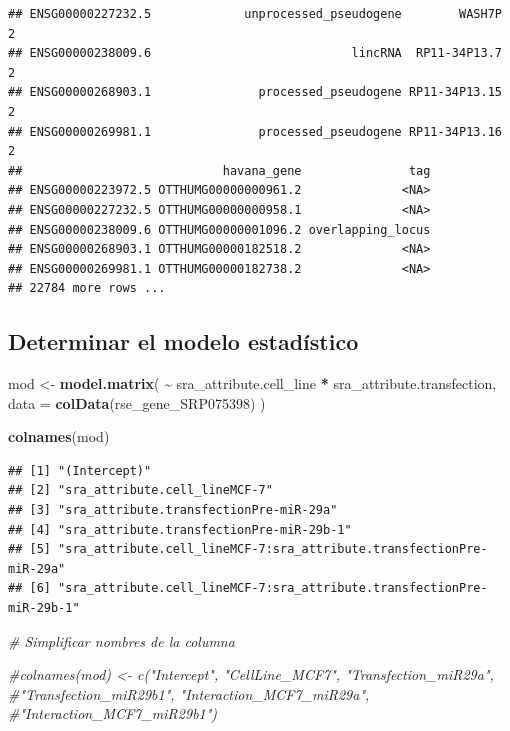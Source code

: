 \documentclass[
]{article}
\newenvironment{Shaded}{\begin{snugshade}}{\end{snugshade}}
\newcommand{\AttributeTok}[1]{\textcolor[rgb]{0.13,0.29,0.53}{#1}}
\newcommand{\CommentTok}[1]{\textcolor[rgb]{0.56,0.35,0.01}{\textit{#1}}}
\newcommand{\FunctionTok}[1]{\textcolor[rgb]{0.13,0.29,0.53}{\textbf{#1}}}
\newcommand{\NormalTok}[1]{#1}
\newcommand{\OtherTok}[1]{\textcolor[rgb]{0.56,0.35,0.01}{#1}}
\newcommand{\SpecialCharTok}[1]{\textcolor[rgb]{0.81,0.36,0.00}{\textbf{#1}}}
\begin{document}
\begin{verbatim}
## ENSG00000227232.5             unprocessed_pseudogene        WASH7P     2
## ENSG00000238009.6                            lincRNA  RP11-34P13.7     2
## ENSG00000268903.1               processed_pseudogene RP11-34P13.15     2
## ENSG00000269981.1               processed_pseudogene RP11-34P13.16     2
##                            havana_gene               tag
## ENSG00000223972.5 OTTHUMG00000000961.2              <NA>
## ENSG00000227232.5 OTTHUMG00000000958.1              <NA>
## ENSG00000238009.6 OTTHUMG00000001096.2 overlapping_locus
## ENSG00000268903.1 OTTHUMG00000182518.2              <NA>
## ENSG00000269981.1 OTTHUMG00000182738.2              <NA>
## 22784 more rows ...
\end{verbatim}

\subsection{Determinar el modelo
estadístico}\label{determinar-el-modelo-estaduxedstico}

\begin{Shaded}
\begin{Highlighting}[]
\NormalTok{mod }\OtherTok{\textless{}{-}} \FunctionTok{model.matrix}\NormalTok{(}
  \SpecialCharTok{\textasciitilde{}}\NormalTok{ sra\_attribute.cell\_line }\SpecialCharTok{*}\NormalTok{ sra\_attribute.transfection,}
  \AttributeTok{data =} \FunctionTok{colData}\NormalTok{(rse\_gene\_SRP075398)}
\NormalTok{)}

\FunctionTok{colnames}\NormalTok{(mod)}
\end{Highlighting}
\end{Shaded}

\begin{verbatim}
## [1] "(Intercept)"                                                         
## [2] "sra_attribute.cell_lineMCF-7"                                        
## [3] "sra_attribute.transfectionPre-miR-29a"                               
## [4] "sra_attribute.transfectionPre-miR-29b-1"                             
## [5] "sra_attribute.cell_lineMCF-7:sra_attribute.transfectionPre-miR-29a"  
## [6] "sra_attribute.cell_lineMCF-7:sra_attribute.transfectionPre-miR-29b-1"
\end{verbatim}

\begin{Shaded}
\begin{Highlighting}[]
\CommentTok{\# Simplificar nombres de la columna}

\CommentTok{\#colnames(mod) \textless{}{-} c("Intercept", "CellLine\_MCF7", "Transfection\_miR29a", }
                   \CommentTok{\#"Transfection\_miR29b1", "Interaction\_MCF7\_miR29a", }
                   \CommentTok{\#"Interaction\_MCF7\_miR29b1")}
\end{Highlighting}
\end{Shaded}
\end{document}
